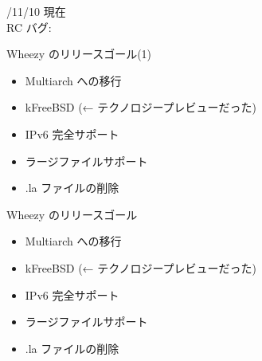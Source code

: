 \documentclass[cjk,dvipdfmx,12pt,compress,%
hyperref={bookmarks=true,bookmarksnumbered=true,bookmarksopen=false,%
  colorlinks=false,%
  pdftitle={第 66 回 関西 Debian 勉強会@KOF2012},%
  pdfauthor={佐々木洋平},%
  pdfsubject={資料},%
}]{beamer}
\begin{document}

\settitleslide
{}
\begin{frame}\end{frame}
\begin{frame}
  \begin{center}
    {\fontsize{80pt}{80pt}}
  \end{center}
\end{frame}
\settitleslide

\settitleslide
{}
\begin{frame}\end{frame}
\begin{frame}
  \begin{center}
    {\fontsize{40pt}{40pt}/11/10 現在 \\RC バグ: \color{green}{\fbox{\color{black}{455}}}}
  \end{center}
\end{frame}
\setdefaultslide


\begin{frame}{Wheezy のリリースゴール(1)}
  \begin{itemize}
  \item Multiarch への移行
  \item kFreeBSD (← テクノロジープレビューだった)
  \item IPv6 完全サポート
  \item ラージファイルサポート
  \item .la ファイルの削除
  \end{itemize}
\end{frame}

\begin{frame}{Wheezy のリリースゴール}

\begin{itemize}
  \item {\color{red}Multiarch への移行}
  \item kFreeBSD (← テクノロジープレビューだった)
  \item IPv6 完全サポート
  \item ラージファイルサポート
  \item .la ファイルの削除
\end{itemize}

\end{frame}
\end{document}
